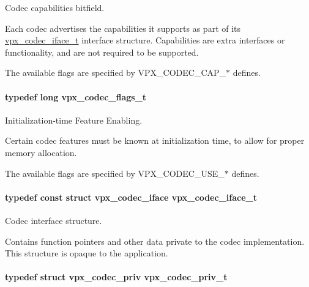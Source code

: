 Codec capabilities bitfield. 

Each codec advertises the capabilities it supports as part of its \hyperlink{group__codec_gae99c3b04f4a567a311211cce3ae6b83b}{vpx\+\_\+codec\+\_\+iface\+\_\+t} interface structure. Capabilities are extra interfaces or functionality, and are not required to be supported.

The available flags are specified by V\+P\+X\+\_\+\+C\+O\+D\+E\+C\+\_\+\+C\+A\+P\+\_\+$\ast$ defines. \hypertarget{group__codec_ga3b36d5af89ddc463489fe5bde0a57877}{
\paragraph[{vpx\+\_\+codec\+\_\+flags\+\_\+t}]{\setlength{\rightskip}{0pt plus 5cm}typedef long {\bf vpx\+\_\+codec\+\_\+flags\+\_\+t}}}\label{group__codec_ga3b36d5af89ddc463489fe5bde0a57877}


Initialization-\/time Feature Enabling. 

Certain codec features must be known at initialization time, to allow for proper memory allocation.

The available flags are specified by V\+P\+X\+\_\+\+C\+O\+D\+E\+C\+\_\+\+U\+S\+E\+\_\+$\ast$ defines. \hypertarget{group__codec_gae99c3b04f4a567a311211cce3ae6b83b}{
\paragraph[{vpx\+\_\+codec\+\_\+iface\+\_\+t}]{\setlength{\rightskip}{0pt plus 5cm}typedef const struct vpx\+\_\+codec\+\_\+iface {\bf vpx\+\_\+codec\+\_\+iface\+\_\+t}}}\label{group__codec_gae99c3b04f4a567a311211cce3ae6b83b}


Codec interface structure. 

Contains function pointers and other data private to the codec implementation. This structure is opaque to the application. \hypertarget{group__codec_ga1e262f91be9141a7176335fd409397ab}{
\paragraph[{vpx\+\_\+codec\+\_\+priv\+\_\+t}]{\setlength{\rightskip}{0pt plus 5cm}typedef struct vpx\+\_\+codec\+\_\+priv {\bf vpx\+\_\+codec\+\_\+priv\+\_\+t}}}\label{group__codec_ga1e262f91be9141a7176335fd409397ab}



